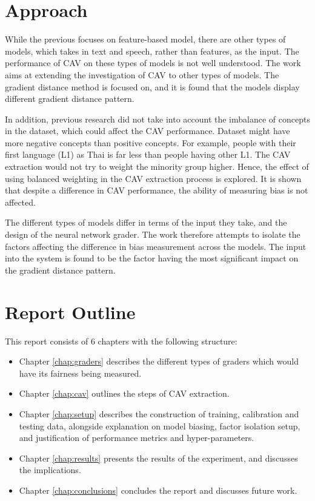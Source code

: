 \section{Approach}
While the previous focuses on feature-based model, there are other types of models, which takes in text and speech, rather than features, as the input. The performance of CAV on these types of models is not well understood. The work aims at extending the investigation of CAV to other types of models. The gradient distance method is focused on, and it is found that the models display different gradient distance pattern.

In addition, previous research did not take into account the imbalance of concepts in the dataset, which could affect the CAV performance. Dataset might have more negative concepts than positive concepts. For example, people with their first language (L1)  as Thai is far less than people having other L1. The CAV extraction would not try to weight the minority group higher. Hence, the effect of using balanced weighting in the CAV extraction process is explored. It is shown that despite a difference in CAV performance, the ability of measuring bias is not affected.

The different types of models differ in terms of the input they take, and the design of the neural network grader. The work therefore attempts to isolate the factors affecting the difference in bias measurement across the models. The input into the system is found to be the factor having the most significant impact on the gradient distance pattern.

\section{Report Outline}
This report consists of 6 chapters with the following structure:
\begin{itemize}
    \item Chapter \ref{chap:graders} describes the different types of graders which would have its fairness being measured.
    \item Chapter \ref{chap:cav} outlines the steps of CAV extraction.
    \item Chapter \ref{chap:setup} describes the construction of training, calibration and testing data, alongside explanation on model biasing, factor isolation setup, and justification of performance metrics and hyper-parameters.
    \item Chapter \ref{chap:results} presents the results of the experiment, and discusses the implications.
    \item Chapter \ref{chap:conclusions} concludes the report and discusses future work.
\end{itemize}